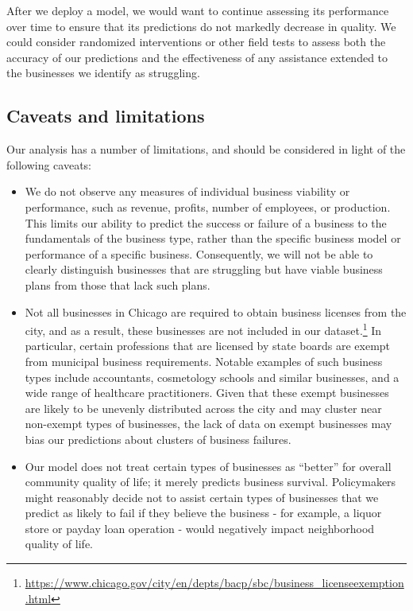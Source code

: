 After we deploy a model, we would want to continue assessing its performance over time to ensure that its predictions do not markedly decrease in quality. We could consider randomized interventions or other field tests to assess both the accuracy of our predictions and the effectiveness of any assistance extended to the businesses we identify as struggling. 

\subsection{Caveats and limitations}
Our analysis has a number of limitations, and should be considered in light of the following caveats:
\begin{itemize}
\item We do not observe any measures of individual business viability or performance, such as revenue, profits, number of employees, or production. This limits our ability to predict the success or failure of a business to the fundamentals of the business type, rather than the specific business model or performance of a specific business. Consequently, we will not be able to clearly distinguish businesses that are struggling but have viable business plans from those that lack such plans.
\item Not all businesses in Chicago are required to obtain business licenses from the city, and as a result, these businesses are not included in our dataset.\footnote{\url{https://www.chicago.gov/city/en/depts/bacp/sbc/business_licenseexemption.html}} In particular, certain professions that are licensed by state boards are exempt from municipal business requirements. Notable examples of such business types include accountants, cosmetology schools and similar businesses, and a wide range of healthcare practitioners. Given that these exempt businesses are likely to be unevenly distributed across the city and may cluster near non-exempt types of businesses, the lack of data on exempt businesses may bias our predictions about clusters of business failures. 
\item Our model does not treat certain types of businesses as “better” for overall community quality of life; it merely predicts business survival. Policymakers might reasonably decide not to assist certain types of businesses that we predict as likely to fail if they believe the business - for example, a liquor store or payday loan operation - would negatively impact neighborhood quality of life.
\end{itemize}

